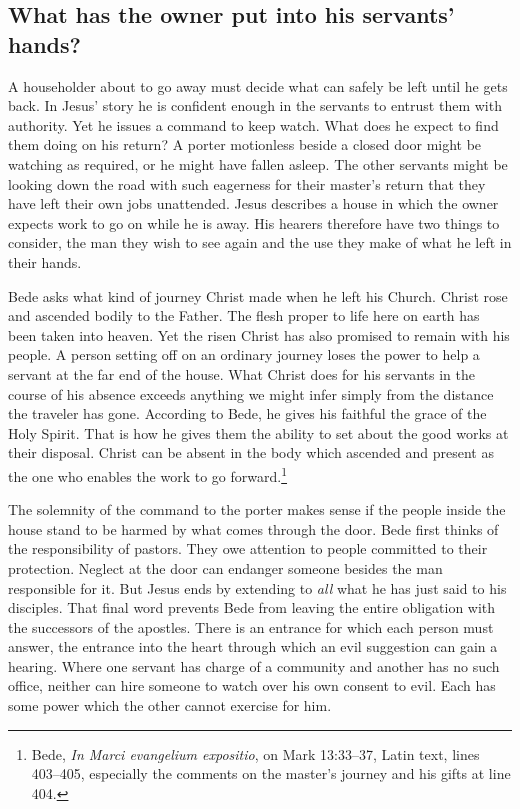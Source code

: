 
\subsection{What has the owner put into his servants' hands?}

A householder about to go away must decide what can safely be left until he gets back. In Jesus' story he is confident enough in the servants to entrust them with authority. Yet he issues a command to keep watch. What does he expect to find them doing on his return? A porter motionless beside a closed door might be watching as required, or he might have fallen asleep. The other servants might be looking down the road with such eagerness for their master's return that they have left their own jobs unattended. Jesus describes a house in which the owner expects work to go on while he is away. His hearers therefore have two things to consider, the man they wish to see again and the use they make of what he left in their hands.

Bede asks what kind of journey Christ made when he left his Church. Christ rose and ascended bodily to the Father. The flesh proper to life here on earth has been taken into heaven. Yet the risen Christ has also promised to remain with his people. A person setting off on an ordinary journey loses the power to help a servant at the far end of the house. What Christ does for his servants in the course of his absence exceeds anything we might infer simply from the distance the traveler has gone. According to Bede, he gives his faithful the grace of the Holy Spirit. That is how he gives them the ability to set about the good works at their disposal. Christ can be absent in the body which ascended and present as the one who enables the work to go forward.\footnote{Bede, \textit{In Marci evangelium expositio}, on Mark 13:33--37, Latin text, lines 403--405, especially the comments on the master's journey and his gifts at line 404.}

The solemnity of the command to the porter makes sense if the people inside the house stand to be harmed by what comes through the door. Bede first thinks of the responsibility of pastors. They owe attention to people committed to their protection. Neglect at the door can endanger someone besides the man responsible for it. But Jesus ends by extending to \emph{all} what he has just said to his disciples. That final word prevents Bede from leaving the entire obligation with the successors of the apostles. There is an entrance for which each person must answer, the entrance into the heart through which an evil suggestion can gain a hearing. Where one servant has charge of a community and another has no such office, neither can hire someone to watch over his own consent to evil. Each has some power which the other cannot exercise for him.


